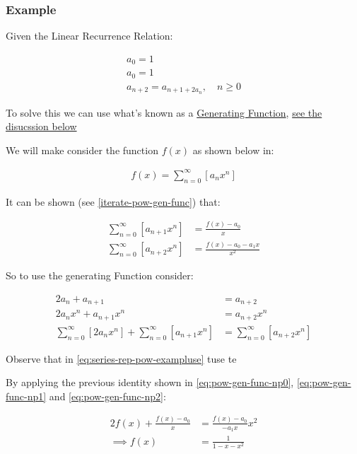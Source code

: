 \documentclass[11pt]{article}
\begin{document}
\subsubsection{Example}
\label{sec:orge4b7317}
Given the Linear Recurrence Relation:

\begin{align*}
a_0= 1 \\
a_0= 1 \\
a_{n+  2} =  a_{n+  1 +  2 a_n}, \quad n \geq 0
\end{align*}

To solve this we can use what's known as a
\href{https://en.wikipedia.org/wiki/Generating\_function}{Generating
Function}, \hyperref[sec:org200f07c]{see the disucssion below}

We will make consider the function \(f(x)\) as shown below in:

\begin{align}
f\left( x \right)= \sum^{\infty}_{n= 0}   \left[ a_nx^n \right] \label{eq:pow-gen-func-np0}
\end{align}


It can be shown (see \eqref{iterate-pow-gen-func}) that:


\begin{align}
    \sum^{\infty}_{n= 0}  \left[ a_{n+  1} x^n \right] &= \frac{f\left( x \right)- a_0}{x} \label{eq:pow-gen-func-np1} \\
\sum^{\infty}_{n= 0}  \left[ a_{n+  2} x^n \right]  &= \frac{f\left( x \right) - a_0 - a_1x}{x^2} \label{eq:pow-gen-func-np2}
\end{align}

So to use the generating Function consider:

\begin{align}
    2a_n +  a_{n+  1 }&= a_{n+  2} \nonumber \\
    2a_nx^n +  a_{n+  1 } x^n &= a_{n+  2} x^n \nonumber \\
    \sum^{\infty}_{n= 0}   \left[ 2a_nx^n \right] + \sum^{\infty}_{n= 0}   \left[  a_{n+  1 } x^n  \right]   &= \sum^{\infty}_{n= 0}   \left[ a_{n+  2} x^n   \right] \label{eq:series-rep-pow-example}
\end{align}

Observe that in \eqref{eq:series-rep-pow-exampluse} tuse te

By applying the previous identity shown in \eqref{eq:pow-gen-func-np0}, \eqref{eq:pow-gen-func-np1} and \eqref{eq:pow-gen-func-np2}:

\begin{align}
2f\left( x \right) +  \frac{f\left( x \right)- a_0}{x} &= \frac{f\left( x \right)- a_0}{- a_1x}x^2 \nonumber \\
\implies  f\left( x \right) &=  \frac{1}{1- x- x^2} \label{eq:power-series-form-example}
\end{align}
\end{document}
